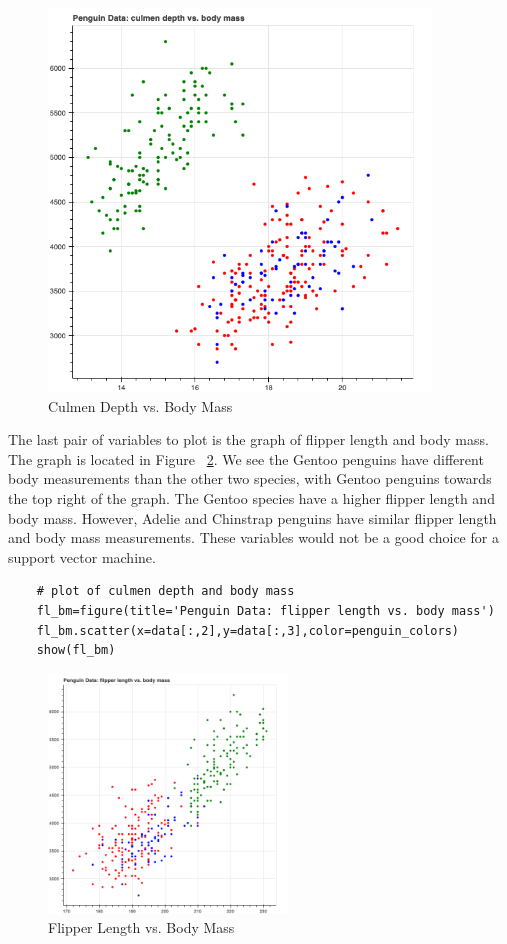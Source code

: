 \documentclass[12pt]{article}
\begin{document}
\begin{figure}[H]
    \centering
    \includegraphics[width=4in]{Figures/penguins/cd_bm.png}
    \caption{Culmen Depth vs. Body Mass}
    \label{fig_cd_bm}
\end{figure}

The last pair of variables to plot is the graph of flipper length and body mass. The graph is located in Figure ~\ref{fig_fl_bm}. We see the Gentoo penguins have different body measurements than the other two species, with Gentoo penguins towards the top right of the graph. The Gentoo species have a higher flipper length and body mass. However, Adelie and Chinstrap penguins have similar flipper length and body mass measurements. These variables would not be a good choice for a support vector machine.

\begin{verbatim}
    # plot of culmen depth and body mass
    fl_bm=figure(title='Penguin Data: flipper length vs. body mass')
    fl_bm.scatter(x=data[:,2],y=data[:,3],color=penguin_colors)
    show(fl_bm)
\end{verbatim}

\begin{figure}[H]
    \centering
    \includegraphics[width=2.5in]{Figures/penguins/fl_bm.png}
    \caption{Flipper Length vs. Body Mass}
    \label{fig_fl_bm}
\end{figure}
\end{document}
